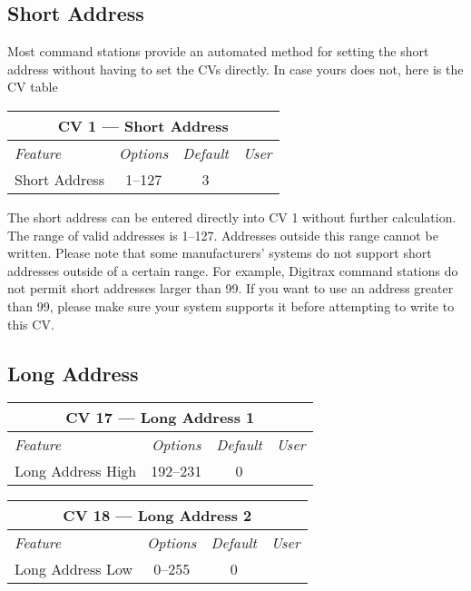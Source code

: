 \documentclass[12pt,letterpaper,draft]{memoir} %
\begin{document}
\subsection{Short Address}
\label{CV1}
Most command stations provide an automated method for setting the short address without having to set the CVs directly. In case yours does not, here is the CV table
\begin{center}
\begin{tabular}{|l|c|c|c|}
\hline
\multicolumn{4}{|c|}{\textbf{CV 1 --- Short Address}} \\ \hline \hline
\textit{Feature} & \textit{Options} & \textit{Default} & \textit{User} \\ \hline
Short Address& 1--127 & 3 &\\ \hline
\end{tabular}
\end{center}

The short address can be entered directly into CV 1 without further calculation. The range of valid addresses is 1--127. Addresses outside this range cannot be written. Please note that some manufacturers' systems do not support short addresses outside of a certain range. For example, Digitrax command stations do not permit short addresses larger than 99. If you want to use an address greater than 99, please make sure your system supports it before attempting to write to this CV.

\subsection{Long Address}
\label{CV17}
\begin{center}
\begin{tabular}{|l|c|c|c|}
\hline
\multicolumn{4}{|c|}{\textbf{CV 17 --- Long Address 1}} \\ \hline \hline
\textit{Feature} & \textit{Options} & \textit{Default} & \textit{User} \\ \hline
Long Address High & 192--231 & 0 &\\ \hline
\end{tabular}
\end{center}

\label{CV18}
\begin{center}
\begin{tabular}{|l|c|c|c|}
\hline
\multicolumn{4}{|c|}{\textbf{CV 18 --- Long Address 2}} \\ \hline \hline
\textit{Feature} & \textit{Options} & \textit{Default} & \textit{User} \\ \hline
Long Address Low & 0--255 & 0 &\\ \hline
\end{tabular}
\end{center}
\end{document}
